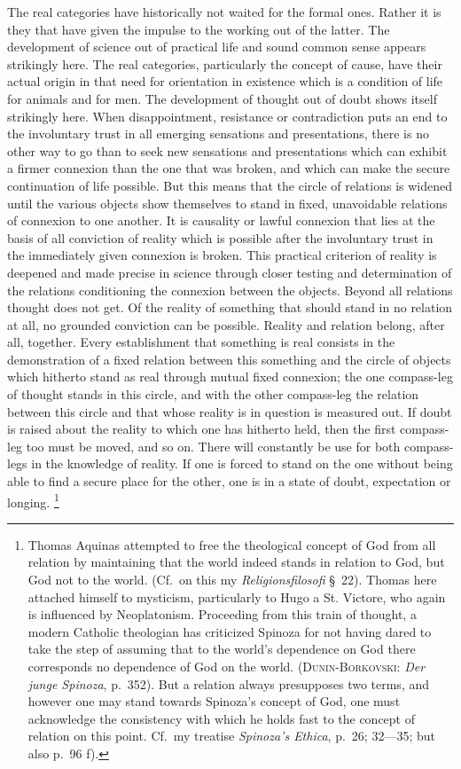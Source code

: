 \documentclass[12pt]{article}
\newcommand{\opage}[1]{\marginnote{\footnotesize\textit{[#1]}}}
\begin{document}
The real categories have historically not waited for the formal ones. Rather
it is they that have given the impulse to the working out of the latter. The
development of science out of practical life and sound common sense appears
strikingly here. The real categories, particularly the concept of cause,
have their actual origin in that need for orientation in existence which is
a condition of life for animals and for \opage{46}men. The development of thought out
of doubt shows itself strikingly here. When disappointment, resistance or
contradiction puts an end to the involuntary trust in all emerging
sensations and presentations, there is no other way to go than to seek new
sensations and presentations which can exhibit a firmer connexion than the
one that was broken, and which can make the secure continuation of life
possible. But this means that the circle of relations is widened until the
various objects show themselves to stand in fixed, unavoidable relations of
connexion to one another. It is causality or lawful connexion that lies at
the basis of all conviction of reality which is possible after the
involuntary trust in the immediately given connexion is broken. This
practical criterion of reality is deepened and made precise in science
through closer testing and determination of the relations conditioning the
connexion between the objects. Beyond all relations thought does not get.
Of the reality of something that should stand in no relation at all, no
grounded conviction can be possible. Reality and relation belong, after all,
together. Every establishment that something is real consists in the
demonstration of a fixed relation between this something and the circle of
objects which hitherto stand as real through mutual fixed connexion; the one
compass-leg of thought stands in this circle, and with the other compass-leg
the relation between this circle and that whose reality is in question is
measured out. If doubt is raised about the reality to which one has hitherto
held, then the first compass-leg too must be moved, and so on. There will
constantly be use for both compass-legs in the knowledge of reality. If one
is forced to stand on the one without being able to find a secure place for
\opage{47}the other, one is in a state of doubt, expectation or longing.%
\footnote{Thomas Aquinas attempted to free the theological concept of God
from all relation by maintaining that the world indeed stands in relation to
God, but God not to the world. (Cf.\ on this my \textit{Religionsfilosofi}
§~22). Thomas here attached himself to mysticism, particularly to Hugo a St.
Victore, who again is influenced by Neoplatonism. Proceeding from this train
of thought, a modern Catholic theologian has criticized Spinoza for not
having dared to take the step of assuming that to the world's dependence on
God there corresponds no dependence of God on the world.
(\textsc{Dunin-Borkovski}: \textit{Der junge Spinoza}, p.~352). But a
relation always presupposes two terms, and however one may stand towards
Spinoza's concept of God, one must acknowledge the consistency with which he
holds fast to the concept of relation on this point. Cf.\ my treatise
\textit{Spinoza's Ethica}, p.~26; 32---35; but also p.~96 f).}
\end{document}
